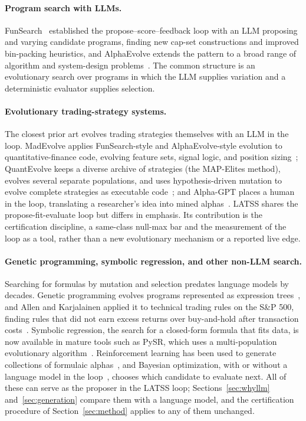 \documentclass[11pt]{article}
\begin{document}
\paragraph{Program search with LLMs.} FunSearch~\cite{funsearch} established the
propose--score--feedback loop with an LLM proposing and varying candidate programs, finding new cap-set constructions and
improved bin-packing heuristics, and AlphaEvolve extends the pattern to a broad range of algorithm and
system-design problems~\cite{alphaevolve}. The common structure is an evolutionary search over programs
in which the LLM supplies variation and a deterministic evaluator supplies selection.

\paragraph{Evolutionary trading-strategy systems.} The closest prior art evolves trading strategies
themselves with an LLM in the loop. MadEvolve applies FunSearch-style and AlphaEvolve-style evolution to
quantitative-finance code, evolving feature sets, signal logic, and position sizing~\cite{madevolve};
QuantEvolve keeps a diverse archive of strategies (the MAP-Elites method), evolves several separate populations, and uses hypothesis-driven mutation to evolve complete
strategies as executable code~\cite{quantevolve}; and Alpha-GPT places a human in the loop, translating a
researcher's idea into mined alphas~\cite{alphagpt}. LATSS shares the propose-fit-evaluate loop but
differs in emphasis. Its contribution is the certification discipline, a same-class null-max bar and the
measurement of the loop as a tool, rather than a new evolutionary mechanism or a reported live
edge.

\paragraph{Genetic programming, symbolic regression, and other non-LLM search.} Searching for formulas
by mutation and selection predates language models by decades. Genetic programming evolves programs
represented as expression trees~\cite{koza}, and Allen and Karjalainen applied it to technical trading
rules on the S\&P 500, finding rules that did not earn excess returns over buy-and-hold after
transaction costs~\cite{allenkarjalainen}. Symbolic regression, the search for a closed-form formula
that fits data, is now available in mature tools such as PySR, which uses a multi-population evolutionary
algorithm~\cite{pysr}. Reinforcement learning has been used to generate collections of formulaic
alphas~\cite{alphagen}, and Bayesian optimization, with or without a language model in the
loop~\cite{llambo}, chooses which candidate to evaluate next. All of these can serve as the proposer in
the LATSS loop; Sections~\ref{sec:whyllm} and~\ref{sec:generation} compare them with a language model,
and the certification procedure of Section~\ref{sec:method} applies to any of them unchanged.
\end{document}
